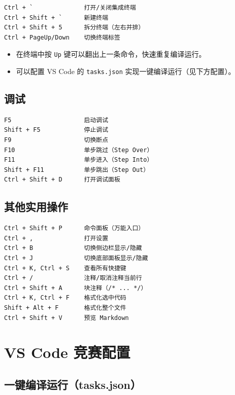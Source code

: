 \documentclass[UTF8,openany,oneside,zihao=-4]{ctexbook}
\begin{document}
\begin{lstlisting}
Ctrl + `              打开/关闭集成终端
Ctrl + Shift + `      新建终端
Ctrl + Shift + 5      拆分终端（左右并排）
Ctrl + PageUp/Down    切换终端标签
\end{lstlisting}

\begin{tip}
\begin{itemize}
  \item 在终端中按 \lstinline|Up| 键可以翻出上一条命令，快速重复编译运行。
  \item 可以配置 VS Code 的 \lstinline|tasks.json| 实现一键编译运行（见下方配置）。
\end{itemize}
\end{tip}

\subsection{调试}

\begin{lstlisting}
F5                    启动调试
Shift + F5            停止调试
F9                    切换断点
F10                   单步跳过（Step Over）
F11                   单步进入（Step Into）
Shift + F11           单步跳出（Step Out）
Ctrl + Shift + D      打开调试面板
\end{lstlisting}

\subsection{其他实用操作}

\begin{lstlisting}
Ctrl + Shift + P      命令面板（万能入口）
Ctrl + ,              打开设置
Ctrl + B              切换侧边栏显示/隐藏
Ctrl + J              切换底部面板显示/隐藏
Ctrl + K, Ctrl + S    查看所有快捷键
Ctrl + /              注释/取消注释当前行
Ctrl + Shift + A      块注释（/* ... */）
Ctrl + K, Ctrl + F    格式化选中代码
Shift + Alt + F       格式化整个文件
Ctrl + Shift + V      预览 Markdown
\end{lstlisting}

\section{VS Code 竞赛配置}

\subsection{一键编译运行（tasks.json）}
\end{document}

